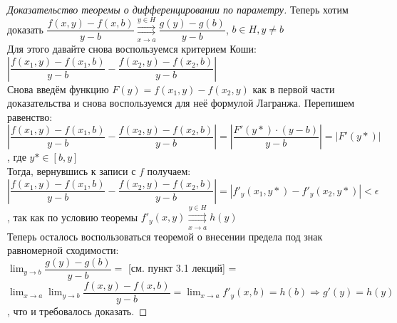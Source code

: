 \begin{proof}[Доказательство теоремы о дифференцировании по параметру]
    Теперь хотим доказать $\dfrac{f(x, y) - f(x, b)}{y - b} \overset{y \in H}{\underset{x \to a}{\rightrightarrows}}
    \dfrac{g(y) - g(b)}{y - b}$, $b \in H, y \neq b$ \\
    Для этого давайте снова воспользуемся критерием Коши: \\
    $\left|\dfrac{f(x_1, y) - f(x_1, b)}{y - b} - \dfrac{f(x_2, y) - f(x_2, b)}{y - b}\right|$ \\
    Снова введём функцию $F(y) = f(x_1, y) - f(x_2, y)$ как в первой части доказательства и снова воспользуемся для 
    неё формулой Лагранжа. Перепишем равенство: \\
    $\left|\dfrac{f(x_1, y) - f(x_1, b)}{y - b} - \dfrac{f(x_2, y) - f(x_2, b)}{y - b}\right| =
    \left|\dfrac{F'(y*) \cdot (y - b)}{y - b}\right| = |F'(y*)| $, где $y* \in [b, y]$ \\
    Тогда, вернувшись к записи с $f$ получаем: \\
    $\left|\dfrac{f(x_1, y) - f(x_1, b)}{y - b} - \dfrac{f(x_2, y) - f(x_2, b)}{y - b}\right| =
    |f'_y(x_1, y*) - f'_y(x_2, y*)| < \epsilon$, так как по условию теоремы
    $f'_y(x, y) \overset{y \in H}{\underset{x \to a}{\rightrightarrows}} h(y)$ \\
    
    Теперь осталось воспользоваться теоремой о внесении предела под знак равномерной сходимости: \\
    $\lim_{y \to b} \dfrac{g(y) - g(b)}{y - b} =$ [см. пункт 3.1 лекций] = 
    $\lim_{x \to a} \lim_{y \to b} \dfrac{f(x, y) - f(x, b)}{y - b} = 
    \lim_{x \to a} f'_y(x, b) = h(b) \Rightarrow g'(y) = h(y)$, что и требовалось доказать.
\end{proof}
